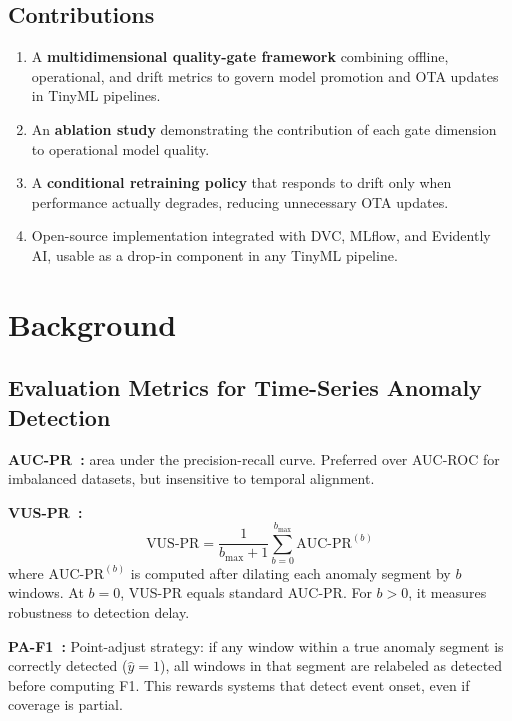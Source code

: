 \documentclass[conference]{IEEEtran}
\begin{document}
\subsection{Contributions}

\begin{enumerate}
  \item A \textbf{multidimensional quality-gate framework} combining
        offline, operational, and drift metrics to govern model promotion
        and OTA updates in TinyML pipelines.
  \item An \textbf{ablation study} demonstrating the contribution of
        each gate dimension to operational model quality.
  \item A \textbf{conditional retraining policy} that responds to drift
        only when performance actually degrades, reducing unnecessary OTA
        updates.
  \item Open-source implementation integrated with DVC, MLflow, and
        Evidently AI, usable as a drop-in component in any TinyML pipeline.
\end{enumerate}

\section{Background}
\label{sec:background}

\subsection{Evaluation Metrics for Time-Series Anomaly Detection}

\textbf{AUC-PR~\cite{davis2006relationship}:}
area under the precision-recall curve.
Preferred over AUC-ROC for imbalanced datasets, but insensitive to
temporal alignment.

\textbf{VUS-PR~\cite{kim2022towards}:}
\begin{equation}
  \text{VUS-PR} = \frac{1}{b_{\max}+1}\sum_{b=0}^{b_{\max}} \text{AUC-PR}^{(b)}
\end{equation}
where $\text{AUC-PR}^{(b)}$ is computed after dilating each anomaly
segment by $b$ windows.
At $b=0$, VUS-PR equals standard AUC-PR.
For $b>0$, it measures robustness to detection delay.

\textbf{PA-F1~\cite{xu2018donut}:}
Point-adjust strategy: if any window within a true anomaly segment is
correctly detected ($\hat{y}=1$), all windows in that segment are
relabeled as detected before computing F1.
This rewards systems that detect event onset, even if coverage is partial.
\end{document}
